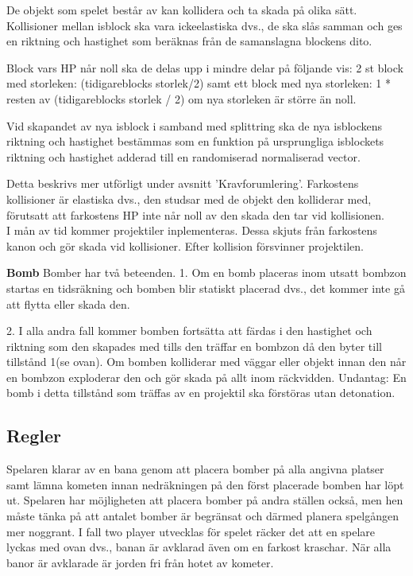 \documentclass{TDP005mall}
\begin{document}
De objekt som spelet består av kan kollidera och ta skada på olika sätt.\\
Kollisioner mellan isblock ska vara ickeelastiska dvs., de ska slås samman och
ges en riktning och hastighet som beräknas från de samanslagna blockens dito.

Block vars HP når noll ska de delas upp i mindre delar på följande vis:
2 st block med storleken: (tidigareblocks storlek/2) 
samt ett block med nya storleken: 1 * resten av (tidigareblocks storlek / 2) 
om nya storleken är större än noll.

Vid skapandet av nya isblock i samband med splittring ska de nya isblockens
riktning och hastighet bestämmas som en funktion på ursprungliga isblockets
riktning och hastighet adderad till en randomiserad normaliserad vector. 

Detta beskrivs mer utförligt under avsnitt 'Kravforumlering'.
Farkostens kollisioner är elastiska dvs., den studsar med de objekt den
kolliderar med, förutsatt att farkostens HP inte når noll av den skada den tar
vid kollisionen. \\

I mån av tid kommer projektiler inplementeras. Dessa skjuts från farkostens kanon
och gör skada vid kollisioner. Efter kollision försvinner projektilen.

\textbf{Bomb}
Bomber har två beteenden.
1. Om en bomb placeras inom utsatt bombzon startas en tidsräkning och bomben blir
statiskt placerad dvs., det kommer inte gå att flytta eller skada den.

2. I alla andra fall kommer bomben fortsätta att färdas i  den hastighet och 
riktning som den skapades med tills den träffar en bombzon då den byter till 
tillstånd 1(se ovan). Om bomben kolliderar med väggar eller objekt innan 
den når en bombzon exploderar den och gör skada på allt inom räckvidden. Undantag:
En bomb i detta tillstånd som träffas av en projektil ska förstöras utan detonation.

\subsection{Regler}
Spelaren klarar av en bana genom att placera bomber på alla angivna platser samt
lämna kometen innan nedräkningen på den först placerade bomben har löpt ut.
Spelaren har möjligheten att placera bomber på andra ställen också, men hen
måste tänka på att antalet bomber är begränsat och därmed planera spelgången mer
noggrant. I fall two player utvecklas för spelet räcker det att en spelare
lyckas med ovan dvs., banan är avklarad även om en farkost kraschar. När alla
banor är avklarade är jorden fri från hotet av kometer.
\end{document}
